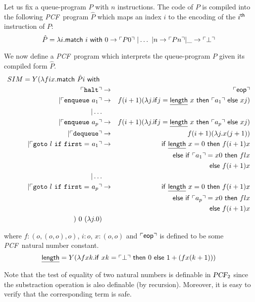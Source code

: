 \documentclass{article}
\newcommand{\encode}[1]{\ulcorner #1 \urcorner}
\newcommand\eop{{\sf eop}}
\newcommand\pcf{\textsl{PCF}}
\begin{document}
Let us fix a queue-program $P$ with $n$ instructions.
The code of $P$ is compiled into the following \pcf\ program $\hat{P}$
which maps an index $i$ to the encoding of the $i^{\sf th}$ instruction of $P$:
\begin{equation}
\hat{P} = \lambda i .  {\sf match\ } i {\sf \ with\ }
   0 \rightarrow \encode{ P 0 }
  \ | \ldots \ | n \rightarrow \encode{ P n }  | \_ \rightarrow \encode{\bot}
\end{equation}

We now define a \pcf\ program which interprets the queue-program $P$ given  its compiled form $\hat{P}$.
\begin{eqnarray*}
SIM = Y ( \lambda f i x . {\sf match\ } \hat{P} i  {\sf \ with\ }   \\
 \encode{ \tt halt }&\rightarrow& \encode{\eop} \\
| \encode{ {\tt enqueue\ } a_1 } &\rightarrow& f (i+1) ( \lambda j . {\sf if} j = \underline{\sf length}\ x\ {\sf then\ } \encode{a_1} {\sf\ else\ } x j ) \\
| \ldots \\
| \encode{ {\tt enqueue\ } a_p } &\rightarrow& f (i+1) ( \lambda j . {\sf if} j = \underline{\sf length}\ x\ {\sf then\ } \encode{a_p} {\sf\ else\ } x j ) \\
| \encode{ {\tt dequeue } } &\rightarrow& f (i+1) (\lambda j . x (j+1) ) \\
| \encode{ {\tt goto\ } l {\tt\ if\ first=\ } a_1 } &\rightarrow&
{\sf if\ } \underline{\sf length}\ x = 0 {\ \sf then\ } f (i+1) x \\
&&{\sf else\ if\ } \encode{a_1} = x 0 {\sf\ then\ } f l x \\
&&{\sf else\ } f (i+1) x \\
| \ldots \\
| \encode{{\tt goto\ } l {\tt\ if\ first=\ } a_p} &\rightarrow&
{\sf if\ } \underline{\sf length}\ x = 0 {\ \sf then\ } f (i+1) x \\
&&{\sf else\ if\ } \encode{a_p} = x 0 {\sf\ then\ } f l x \\
&&{\sf else\ } f (i+1) x \\
)\ 0\ (\lambda j . 0)
\end{eqnarray*}

where $f: (o,(o,o),o)$, $i:o$, $x:(o,o)$ and $\encode{\eop}$ is defined to be some \pcf\ natural number constant.
$$ \underline{\sf  length}  = Y( \lambda f x k . {\sf if\ } x k = \encode{\bot} {\sf\ then\ } 0 {\sf\ else\ } 1 + (f x (k+1)))$$

Note that the test of equality of two natural numbers is definable in $\pcf_2$ since the substraction operation is  also definable (by recursion). Moreover, it is easy to verify that the corresponding term is safe.
\end{document}
